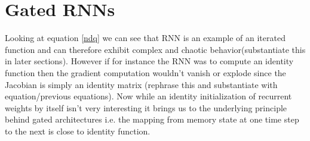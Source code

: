 \section{Gated RNNs}
Looking at equation \ref{ndq} we can see that RNN is an example of an iterated function and can therefore exhibit complex and chaotic behavior(substantiate this in later sections). However if for instance the RNN was to compute an identity function then the gradient computation wouldn't vanish or explode since the Jacobian is simply an identity matrix (rephrase this and substantiate with equation/previous equations). Now while an identity initialization of recurrent weights by itself isn't very interesting it brings us to the underlying principle behind gated architectures i.e. the mapping from memory state at one time step to the next is close to identity function.

